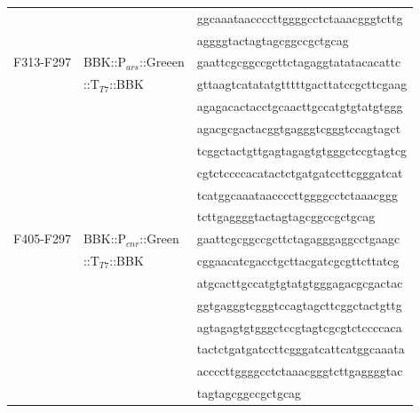 \begin{table}[ht!]
{\begin{tabular*}{\columnwidth}{@{}lll@{}}
\\
& & \MakeLowercase{GGCAAATAACCCCTTGGGGCCTCTAAACGGGTCTTG}
\\
& & \MakeLowercase{AGGGGtactagtagcggccgctgcag}
\\
F313-F297 & BBK::P$_{ars}$::Greeen & \MakeLowercase{GAATTCGCGGCCGCTTCTAGAGGTATATACACATTC}
\\
& ::T$_{T7}$::BBK & \MakeLowercase{GTTAAGTCATATATGTTTTTGACTTATCCGCTTCGAAG}
\\
& & \MakeLowercase{AGAGACACTACCTGCAACTTGCCATGTGTATGTGGG}
\\
& & \MakeLowercase{AGACGCGACTACGGTGAGGGTCGGGTCCAGTAGCT}
\\
& & \MakeLowercase{TCGGCTACTGTTGAGTAGAGTGTGGGCTCCGTAGTCG}
\\
&& \MakeLowercase{CGTCTCCCCACATACTCTGATGATCCTTCGGGATCAT}
\\
& & \MakeLowercase{TCATGGCAAATAACCCCTTGGGGCCTCTAAACGGG}
\\
& & \MakeLowercase{TCTTGAGGGGtactagtagcggccgctgcag}
\\
F405-F297 & BBK::P$_{cnr}$::Green & \MakeLowercase{GAATTCGCGGCCGCTTCTAGAGggaggcctgaagc}
\\
& ::T$_{T7}$::BBK & \MakeLowercase{cggaacatcgacctgcttacgatcgcgttcttatcg}
\\
& & \MakeLowercase{atgcacTTGCCATGTGTATGTGGGAGACGCGACTAC}
\\
& & \MakeLowercase{GGTGAGGGTCGGGTCCAGTAGCTTCGGCTACTGTTG}
\\
& & \MakeLowercase{AGTAGAGTGTGGGCTCCGTAGTCGCGTCTCCCCACA}
\\
&&\MakeLowercase{TACTCTGATGATCCTTCGGGATCATTCATGGCAAATA}
\\
& & \MakeLowercase{ACCCCTTGGGGCCTCTAAACGGGTCTTGAGGGGtac}
\\
& & \MakeLowercase{tagtagcggccgctgcag}
\\



\hline
\end{tabular*}
} { }
\end{table}

